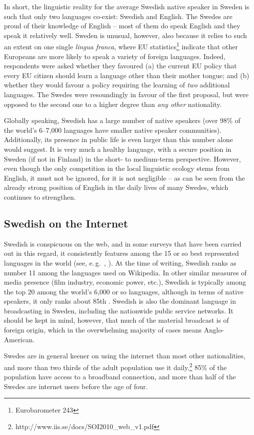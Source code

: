 \begin{multicols}{2}
In short, the linguistic reality for the average Swedish native
speaker in Sweden is such that only two languages co-exist: Swedish
and English. The Swedes are proud of their knowledge of English -- most
of them do speak English and they speak it relatively well. Sweden is
unusual, however, also because it relies to such an extent on one
single \textit{lingua franca}, where EU
statistics\footnote{Eurobarometer 243} indicate that other Europeans
are more likely to speak a variety of foreign languages. Indeed,
respondents were asked whether they favoured (a) the current EU policy
that every EU citizen should learn a language other than their mother
tongue; and (b) whether they would favour a policy requiring the
learning of \textit{two} additional languages. The Swedes were
resoundingly in favour of the first proposal, but were opposed to the
second one to a higher degree than \textit{any other} nationality.

Globally speaking, Swedish has a large number of native speakers (over
98\% of the world’s 6--7,000 languages have smaller native speaker
communities). Additionally, its presence in public life is even larger
than this number alone would suggest. It is very much a healthy
language, with a secure position in Sweden (if not in Finland) in the
short- to medium-term perspective. However, even though the only
competition in the local linguistic ecology stems from English, it
must not be ignored, for it is not negligible -- as can be seen from
the already strong position of English in the daily lives of many
Swedes, which continues to strengthen.

\subsection{Swedish on the Internet}

Swedish is conspicuous on the web, and in some surveys that have been
carried out in this regard, it consistently features among the 15
or so best represented languages in the world (see, e.\,g.~,
\cite[63]{parkvall2006}). At the time of writing, Swedish ranks as
number 11 among the languages used on Wikipedia. In other similar
measures of media presence (film industry, economic power, etc.),
Swedish is typically among the top 20 among the world’s 6,000 or so
languages, although in terms of native speakers, it only ranks about
85th \cite[55--64]{parkvall2006}. Swedish is also the dominant
language in broadcasting in Sweden, including the nationwide public
service networks. It should be kept in mind, however, that much of the
material broadcast is of foreign origin, which in the overwhelming
majority of cases means Anglo-American.


Swedes are in general keener on using the internet than most other
nationalities, and more than two thirds of the adult population use it
daily.\footnote{http://www.iis.se/docs/SOI2010\_web\_v1.pdf } 85\% of
the population have access to a broadband connection, and more than
half of the Swedes are internet users before the age of four.
\end{multicols}

